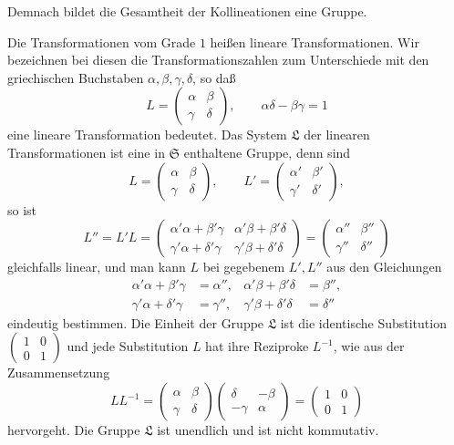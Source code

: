 \documentclass[11pt]{article}
\begin{document}
Demnach bildet die Gesamtheit der Kollineationen eine Gruppe.

Die Transformationen vom Grade $1$ heißen lineare Transformationen. Wir bezeichnen bei diesen die Transformationszahlen zum Unterschiede mit den griechischen Buchstaben $\alpha,\beta,\gamma,\delta$, so daß
\[
L=\begin{pmatrix}\alpha&\beta\\ \gamma&\delta\end{pmatrix},
\qquad \alpha\delta-\beta\gamma=1
\]
eine lineare Transformation bedeutet. Das System $\mathfrak L$ der linearen Transformationen ist eine in $\mathfrak S$ enthaltene Gruppe, denn sind
\[
L=\begin{pmatrix}\alpha&\beta\\ \gamma&\delta\end{pmatrix},
\qquad
L'=\begin{pmatrix}\alpha'&\beta'\\ \gamma'&\delta'\end{pmatrix},
\]
so ist
\[
L''=L'L=\begin{pmatrix}
\alpha'\alpha+\beta'\gamma&\alpha'\beta+\beta'\delta\\
\gamma'\alpha+\delta'\gamma&\gamma'\beta+\delta'\delta
\end{pmatrix}
=\begin{pmatrix}\alpha''&\beta''\\ \gamma''&\delta''\end{pmatrix}
\]
gleichfalls linear, und man kann $L$ bei gegebenem $L',L''$ aus den Gleichungen
\[
\begin{aligned}
\alpha'\alpha+\beta'\gamma&=\alpha'',&
\alpha'\beta+\beta'\delta&=\beta'',\\
\gamma'\alpha+\delta'\gamma&=\gamma'',&
\gamma'\beta+\delta'\delta&=\delta''
\end{aligned}
\]
eindeutig bestimmen. Die Einheit der Gruppe $\mathfrak L$ ist die identische Substitution $\begin{pmatrix}1&0\\0&1\end{pmatrix}$ und jede Substitution $L$ hat ihre Reziproke $L^{-1}$, wie aus der Zusammensetzung
\[
LL^{-1}=\begin{pmatrix}\alpha&\beta\\\gamma&\delta\end{pmatrix}
\begin{pmatrix}\delta&-\beta\\-\gamma&\alpha\end{pmatrix}
=\begin{pmatrix}1&0\\0&1\end{pmatrix}
\]
hervorgeht. Die Gruppe $\mathfrak L$ ist unendlich und ist nicht kommutativ.
\end{document}
